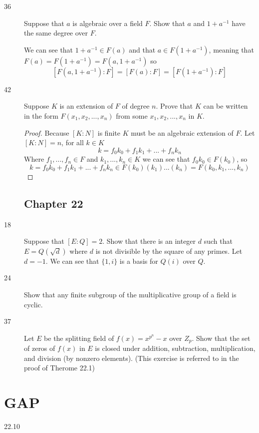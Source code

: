 \documentclass[11pt]{article}
\begin{document}
\begin{description}
\item[36] 
	Suppose that $a$ is algebraic over a field $F$. Show that $a$ and
	$1+a^{-1}$ have the same degree over $F$.	
	
	We can see that $1+a^{-1} \in F(a)$ and that $a \in F(1+a^{-1})$,
	meaning that $F(a) = F(1+a^{-1}) = F(a,1+a^{-1})$ so
		$$[F(a,1+a^{-1}):F] = [F(a):F] = [F(1+a^{-1}):F]$$
\item[42] Suppose $K$ is an extension of $F$ of degree $n$. Prove that $K$ can
	be written in the form $F(x_1,x_2,...,x_n)$ from some $x_1,x_2,...,x_n$
	in $K$.
	\begin{proof}
	Because $[K:N]$ is finite $K$ must be an algebraic extension of $F$. Let
	$[K:N] = n$, for all $k \in K$ 
		$$k = f_0k_0 + f_1k_1 + ... + f_nk_n$$
	Where $f_1,...,f_n \in F$ and $k_1, ... ,k_n \in K$ we can see that
	$f_0k_0 \in F(k_0)$, so 
		$$k = f_0k_0 + f_1k_1 + ... + f_nk_n \in F(k_0)(k_1)...(k_n) =
		F(k_0,k_1,...,k_n)$$
	\end{proof}

\subsection{Chapter 22}
\item[18]
	Suppose that $[E:Q] = 2$. Show that there is an integer $d$ such that
		$E = Q(\sqrt d)$ where $d$ is not divisible by the square of any
		primes. 
	Let $d = -1$. We can see that $\{1,i\}$ is a basis for $Q(i)$ over $Q$.
\item[24]
	Show that any finite subgroup of the multiplicative group of a field is
	cyclic.

\item[37]
	Let $E$ be the splitting field of $f(x) = x^{p^n}-x$ over $Z_p$. Show
	that the set of zeros of $f(x)$ in $E$ is closed under addition,
	subtraction, multiplication, and division (by nonzero elements). (This
	exercise is referred to in the proof of Therome 22.1)

\end{description}
\section{GAP}
\begin{description}

\item[22.10]

\end{description}
\end{document}

